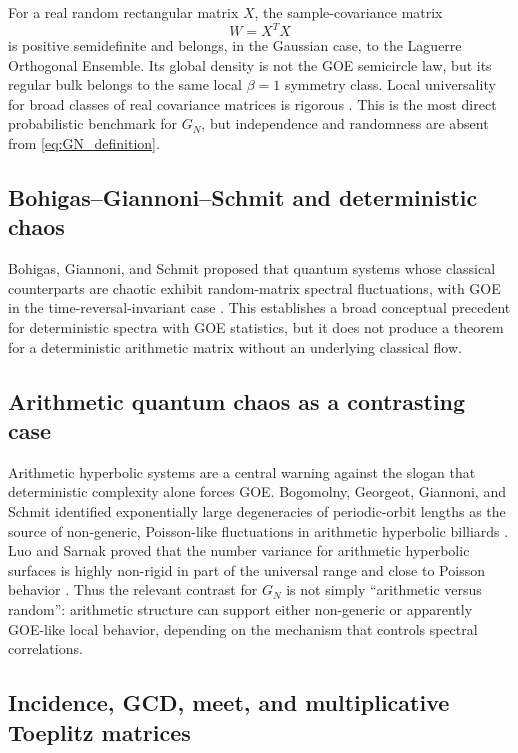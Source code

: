 \documentclass[11pt]{amsart}
\numberwithin{equation}{section}
\theoremstyle{plain}
\theoremstyle{definition}
\theoremstyle{remark}
\begin{document}
For a real random rectangular matrix $X$, the sample-covariance matrix
\begin{equation}
W=X^TX
\label{eq:wishart_matrix}
\end{equation}
is positive semidefinite and belongs, in the Gaussian case, to the Laguerre Orthogonal Ensemble.  Its global density is not the GOE semicircle law, but its regular bulk belongs to the same local $\beta=1$ symmetry class.  Local universality for broad classes of real covariance matrices is rigorous \cite{TaoVu2012,PillaiYin2014}.  This is the most direct probabilistic benchmark for $G_N$, but independence and randomness are absent from \eqref{eq:GN_definition}.

\subsection{Bohigas--Giannoni--Schmit and deterministic chaos}
\label{subsec:bgs_literature}

Bohigas, Giannoni, and Schmit proposed that quantum systems whose classical counterparts are chaotic exhibit random-matrix spectral fluctuations, with GOE in the time-reversal-invariant case \cite{BGS1984}.  This establishes a broad conceptual precedent for deterministic spectra with GOE statistics, but it does not produce a theorem for a deterministic arithmetic matrix without an underlying classical flow.

\subsection{Arithmetic quantum chaos as a contrasting case}
\label{subsec:arithmetic_quantum_chaos}

Arithmetic hyperbolic systems are a central warning against the slogan that deterministic complexity alone forces GOE.  Bogomolny, Georgeot, Giannoni, and Schmit identified exponentially large degeneracies of periodic-orbit lengths as the source of non-generic, Poisson-like fluctuations in arithmetic hyperbolic billiards \cite{BogomolnyEtAl1992}.  Luo and Sarnak proved that the number variance for arithmetic hyperbolic surfaces is highly non-rigid in part of the universal range and close to Poisson behavior \cite{LuoSarnak1994}.  Thus the relevant contrast for $G_N$ is not simply ``arithmetic versus random'': arithmetic structure can support either non-generic or apparently GOE-like local behavior, depending on the mechanism that controls spectral correlations.

\subsection{Incidence, GCD, meet, and multiplicative Toeplitz matrices}
\label{subsec:incidence_gcd_toeplitz}
\end{document}
